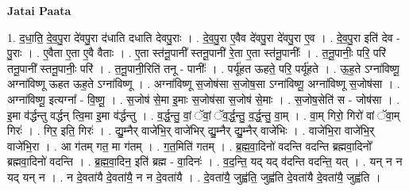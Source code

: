 \documentclass[17pt]{extarticle}
\begin{document}
\textbf{Jatai Paata} \newline

1. द॒धा॒ति॒ दे॒व॒पु॒रा दे॑वपु॒रा द॑धाति दधाति देवपु॒राः । . दे॒व॒पु॒रा ए॒वैव दे॑वपु॒रा दे॑वपु॒रा ए॒व । . दे॒व॒पु॒रा इति॑ देव - पु॒राः । . ए॒वैता ए॒ता ए॒वै वैताः । . ए॒ता स्त॑नू॒पानी᳚ स्तनू॒पानी॑ रे॒ता ए॒ता स्त॑नू॒पानीः᳚ । . त॒नू॒पानीः॒ परि॒ परि॑ तनू॒पानी᳚ स्तनू॒पानीः॒ परि॑ । . त॒नू॒पानी॒रिति॑ तनू - पानीः᳚ । . पर्यू॑हत ऊहते॒ परि॒ पर्यू॑हते । . ऊ॒ह॒ते ऽग्ना॑विष्णू॒ अग्ना॑विष्णू ऊहत ऊह॒ते ऽग्ना॑विष्णू । . अग्ना॑विष्णू स॒जोष॑सा स॒जोष॒सा ऽग्ना॑विष्णू॒ अग्ना॑विष्णू स॒जोष॑सा । . अग्ना॑विष्णू॒ इत्यग्ना᳚ - वि॒ष्णू॒ । . स॒जोष॑ से॒मा इ॒माः स॒जोष॑सा स॒जोष॑ से॒माः । . स॒जोष॒सेति॑ स - जोष॑सा । . इ॒मा व॑र्द्धन्तु वर्द्धन् त्वि॒मा इ॒मा व॑र्द्धन्तु । . व॒र्द्ध॒न्तु॒ वां॒ ॅवां॒ ॅव॒र्द्ध॒न्तु॒ व॒र्द्ध॒न्तु॒ वा॒म् । . वा॒म् गिरो॒ गिरो॑ वां ॅवा॒म् गिरः॑ । . गिर॒ इति॒ गिरः॑ । . द्यु॒म्नैर् वाजे॑भि॒र् वाजे॑भिर् द्यु॒म्नैर् द्यु॒म्नैर् वाजे॑भिः । . वाजे॑भि॒रा वाजे॑भि॒र् वाजे॑भि॒रा । . आ ग॑तम् गत॒ मा ग॑तम् । . ग॒त॒मिति॑ गतम् । . ब्र॒ह्म॒वा॒दिनो॑ वदन्ति वदन्ति ब्रह्मवा॒दिनो᳚ ब्रह्मवा॒दिनो॑ वदन्ति । . ब्र॒ह्म॒वा॒दिन॒ इति॑ ब्रह्म - वा॒दिनः॑ । . व॒द॒न्ति॒ यद् यद् व॑दन्ति वदन्ति॒ यत् । . यन् न न यद् यन् न । . न दे॒वता॑यै दे॒वता॑यै॒ न न दे॒वता॑यै । . दे॒वता॑यै॒ जुह्व॑ति॒ जुह्व॑ति दे॒वता॑यै दे॒वता॑यै॒ जुह्व॑ति । \newline
\end{document}
